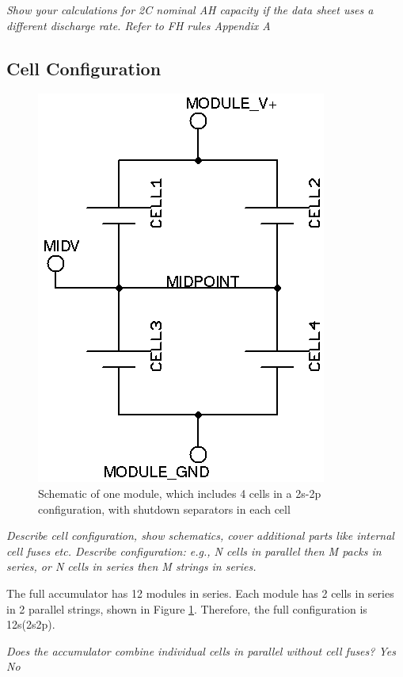 \documentclass{article}
\begin{document}
        \textit{Show your calculations for 2C nominal AH capacity if the data sheet uses a different discharge rate. Refer to FH rules Appendix A}

    \subsection{Cell Configuration}

            \begin{figure}[H]
                \centering
                \includegraphics{moduleschem}
                \caption{Schematic of one module, which includes 4 cells in a 2s-2p configuration, with shutdown separators in each cell}
                \label{moduleschem}
            \end{figure}

        \textit{Describe cell configuration, show schematics, cover additional parts like internal cell fuses etc. Describe configuration: e.g., N cells in parallel then M packs in series, or N cells in series then M strings in series.}

        The full accumulator has 12 modules in series. Each module has 2 cells in series in 2 parallel strings, shown in Figure \ref{moduleschem}. Therefore, the full configuration is 12s(2s2p).

        \textit{Does the accumulator combine individual cells in parallel without cell fuses? \makebox[0pt][l]{$\square$}\raisebox{.15ex}{\hspace{0.1em}$\checkmark$} \hspace{0.2cm} Yes
        \makebox[0pt][l]{$\square$}\raisebox{.15ex}{\hspace{0.1em}} \hspace{0.2cm} No}
\end{document}
